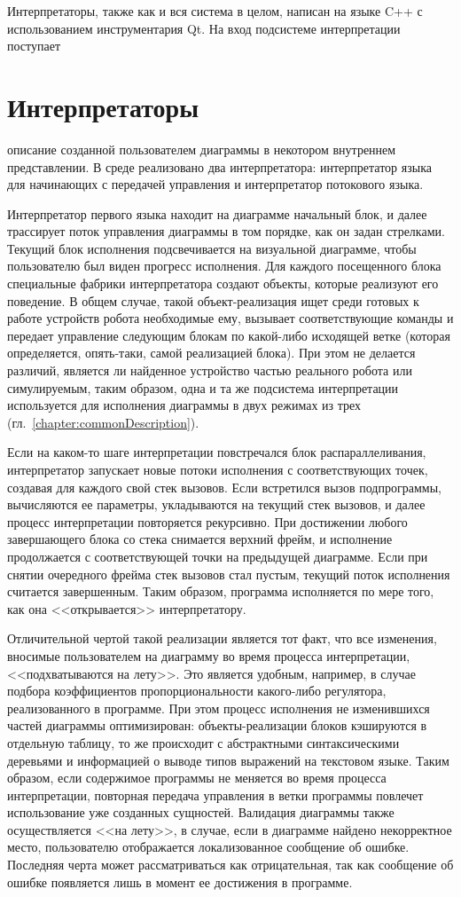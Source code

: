 \documentclass[a5paper]{article}
\begin{document}
Интерпретаторы, также как и вся система в целом, написан на языке C++ с использованием инструментария Qt. На вход подсистеме интерпретации поступает \section{Интерпретаторы}
описание созданной пользователем диаграммы в некотором внутреннем представлении. В среде реализовано два интерпретатора: интерпретатор языка для начинающих с передачей управления и интерпретатор потокового языка.

Интерпретатор первого языка находит на диаграмме начальный блок, и далее трассирует поток управления диаграммы в том порядке, как он задан стрелками.  Текущий блок исполнения подсвечивается на визуальной диаграмме, чтобы пользователю был виден прогресс исполнения. Для каждого посещенного блока специальные фабрики интерпретатора создают объекты, которые реализуют его поведение. В общем случае, такой объект-реализация ищет среди готовых к работе устройств робота необходимые ему, вызывает соответствующие команды и передает управление следующим блокам по какой-либо исходящей ветке (которая определяется, опять-таки, самой реализацией блока). При этом не делается различий, является ли найденное устройство частью реального робота или симулируемым, таким образом, одна и та же подсистема интерпретации используется для исполнения диаграммы в двух режимах из трех (гл.~\ref{chapter:commonDescription}).

Если на каком-то шаге интерпретации повстречался блок распараллеливания, интерпретатор запускает новые потоки исполнения с соответствующих точек, создавая для каждого свой стек вызовов. Если встретился вызов подпрограммы, вычисляются ее параметры, укладываются на текущий стек вызовов, и далее процесс интерпретации повторяется рекурсивно. При достижении любого завершающего блока со стека снимается верхний фрейм, и исполнение продолжается с соответствующей точки на предыдущей диаграмме. Если при снятии очередного фрейма стек вызовов стал пустым, текущий поток исполнения считается завершенным. Таким образом, программа исполняется по мере того, как она <<открывается>> интерпретатору.

Отличительной чертой такой реализации является тот факт, что все изменения, вносимые пользователем на диаграмму во время процесса интерпретации, <<подхватываются на лету>>. Это является удобным, например, в случае подбора коэффициентов пропорциональности какого-либо регулятора, реализованного в программе. При этом процесс исполнения не изменившихся частей диаграммы оптимизирован: объекты-реализации блоков кэшируются в отдельную таблицу, то же происходит с абстрактными синтаксическими деревьями и информацией о выводе типов выражений на текстовом языке. Таким образом, если содержимое программы не меняется во время процесса интерпретации, повторная передача управления в ветки программы повлечет использование уже созданных сущностей. Валидация диаграммы также осуществляется <<на лету>>, в случае, если в диаграмме найдено некорректное место, пользователю отображается локализованное сообщение об ошибке. Последняя черта может рассматриваться как отрицательная, так как сообщение об ошибке появляется лишь в момент ее достижения в программе.
\end{document}
